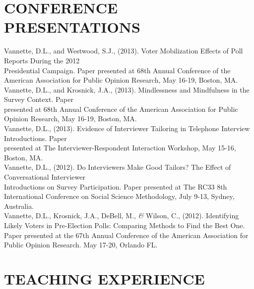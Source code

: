 \documentclass[a4paper,10pt]{article} %
\newcommand{\amper}{{\fontspec[Scale=.95]{Hoefler Text}\selectfont\itshape\&}}
\begin{document}

\section{\small CONFERENCE PRESENTATIONS}

Vannette, D.L., and Westwood, S.J., (2013). Voter Mobilization Effects of Poll Reports During the 2012 \\ Presidential Campaign. Paper presented at 68th Annual Conference of the American Association for Public Opinion Research, May 16-19, Boston, MA.
\medskip \\
Vannette, D.L., and Krosnick, J.A., (2013). Mindlessness and Mindfulness in the Survey Context. Paper\\ presented at 68th Annual Conference of the American Association for Public Opinion Research, May 16-19, Boston, MA.
\medskip \\
Vannette, D.L., (2013). Evidence of Interviewer Tailoring in Telephone Interview Introductions. Paper\\ presented at The Interviewer-Respondent Interaction Workshop, May 15-16, Boston, MA.
\medskip \\
Vannette, D.L., (2012). Do Interviewers Make Good Tailors? The Effect of Conversational Interviewer\\ Introductions on Survey Participation. Paper presented at The RC33 8th International Conference on Social Science Methodology, July 9-13, Sydney, Australia. 
\medskip \\
Vannette, D.L., Krosnick, J.A., DeBell, M., \amper{} Wilson, C., (2012). Identifying Likely Voters in Pre-Election Polls: Comparing Methods to Find the Best One. Paper presented at the 67th Annual Conference of the American Association for Public Opinion Research. May 17-20, Orlando FL.\\


\section{\small TEACHING EXPERIENCE }
\end{document}
